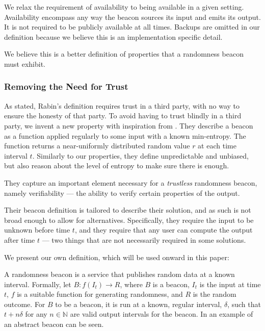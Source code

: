 We relax the requirement of availability to being available in a given setting.
Availability encompass any way the beacon sources its input and emits its output.
It is not required to be publicly available at all times.
Backups are omitted in our definition because we believe this is an implementation specific detail.

We believe this is a better definition of properties that a randomness beacon must exhibit.

\subsubsection{Removing the Need for Trust}
As stated, Rabin's definition requires trust in a third party, with no way to ensure the honesty of that party.
To avoid having to trust blindly in a third party, we invent a new property with inspiration from \citet{bonneau2015bitcoin}.
They describe a beacon as a function applied regularly to some input with a known min-entropy.
The function returns a near-uniformly distributed random value $r$ at each time interval $t$.
Similarly to our properties, they define unpredictable and unbiased, but also reason about the level of entropy to make sure there is enough.

They capture an important element necessary for a \emph{trustless} randomness beacon, namely verifiability --- the ability to verify certain properties of the output.

Their beacon definition is tailored to describe their solution, and as such is not broad enough to allow for alternatives.
Specifically, they require the input to be unknown before time $t$, and they require that any user can compute the output after time $t$ --- two things that are not necessarily required in some solutions.

We present our own definition, which will be used onward in this paper:

A randomness beacon is a service that publishes random data at a known interval.
Formally, let $B: f(I_t) \rightarrow R$, where $B$ is a beacon, $I_t$ is the input at time $t$, $f$ is a suitable function for generating  randomness, and $R$  is the random outcome. %
For $B$ to be a beacon, it is run at a known, regular interval, $\delta$, such that $t+n\delta$ for any $n \in \mathbb{N}$ are valid output intervals for the beacon.
In  an example of an abstract beacon can be seen.

